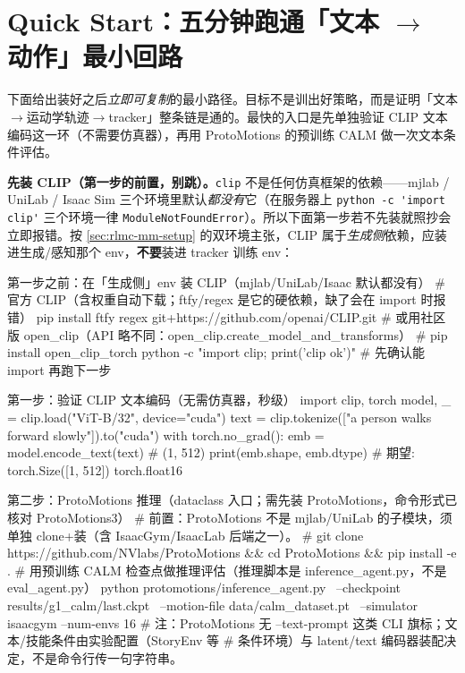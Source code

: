 \section*{\texorpdfstring{Quick Start：五分钟跑通「文本 $\to$ 动作」最小回路}{Quick Start：五分钟跑通文本到动作最小回路}}
\label{sec:rlmc-mm-quickstart}

下面给出装好之后\emph{立即可复制}的最小路径。目标不是训出好策略，而是证明「文本$\to$运动学轨迹$\to$tracker」整条链是通的。最快的入口是先单独验证 CLIP 文本编码这一环（不需要仿真器），再用 ProtoMotions 的预训练 CALM 做一次文本条件评估。

\textbf{先装 CLIP（第一步的前置，别跳）。}\verb|clip| 不是任何仿真框架的依赖——mjlab / UniLab / Isaac Sim 三个环境里默认\emph{都没有}它（在服务器上 \verb|python -c 'import clip'| 三个环境一律 \verb|ModuleNotFoundError|）。所以下面第一步若不先装就照抄会立即报错。按 \cref{sec:rlmc-mm-setup} 的双环境主张，CLIP 属于\emph{生成侧}依赖，应装进生成/感知那个 env，\textbf{不要}装进 tracker 训练 env：

\begin{codebox}[bash]{第一步之前：在「生成侧」env 装 CLIP（mjlab/UniLab/Isaac 默认都没有）}
# 官方 CLIP（含权重自动下载；ftfy/regex 是它的硬依赖，缺了会在 import 时报错）
pip install ftfy regex git+https://github.com/openai/CLIP.git
# 或用社区版 open_clip（API 略不同：open_clip.create_model_and_transforms）
# pip install open_clip_torch
python -c "import clip; print('clip ok')"        # 先确认能 import 再跑下一步
\end{codebox}

\begin{codebox}[Python]{第一步：验证 CLIP 文本编码（无需仿真器，秒级）}
import clip, torch
model, _ = clip.load("ViT-B/32", device="cuda")
text = clip.tokenize(["a person walks forward slowly"]).to("cuda")
with torch.no_grad():
    emb = model.encode_text(text)        # (1, 512)
print(emb.shape, emb.dtype)              # 期望: torch.Size([1, 512]) torch.float16
\end{codebox}

\begin{codebox}[bash]{第二步：ProtoMotions 推理（dataclass 入口；需先装 ProtoMotions，命令形式已核对 ProtoMotions3）}
# 前置：ProtoMotions 不是 mjlab/UniLab 的子模块，须单独 clone+装（含 IsaacGym/IsaacLab 后端之一）。
#   git clone https://github.com/NVlabs/ProtoMotions && cd ProtoMotions && pip install -e .
# 用预训练 CALM 检查点做推理评估（推理脚本是 inference_agent.py，不是 eval_agent.py）
python protomotions/inference_agent.py \
    --checkpoint results/g1_calm/last.ckpt \
    --motion-file data/calm_dataset.pt \
    --simulator isaacgym --num-envs 16
# 注：ProtoMotions 无 --text-prompt 这类 CLI 旗标；文本/技能条件由实验配置（StoryEnv 等
#     条件环境）与 latent/text 编码器装配决定，不是命令行传一句字符串。
\end{codebox}

